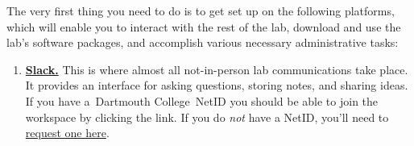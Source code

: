 \documentclass{tufte-book} %
\newcommand{\ourschool}{Dartmouth College}
\begin{document}
\noindent
The very first thing you need to do is to get set up on the following
platforms, which will enable you to interact with the rest of the lab,
download and use the lab's software packages, and accomplish various
necessary administrative tasks: 
\begin{enumerate}
\item \href{https://context-lab.slack.com}{\textbf{Slack.}}  This is where
  almost all not-in-person lab communications take place.  It provides
  an interface for asking questions, storing notes, and sharing
  ideas.  If you have a~\ourschool~NetID you should be able to join the workspace by clicking the link.
  If you do \textit{not} have a NetID, you'll need to \href{https://services.dartmouth.edu/TDClient/1806/Portal/Requests/ServiceDet?ID=30581}{request one here}.


\end{enumerate}
\end{document}
